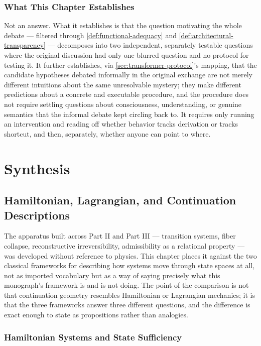 \documentclass[11pt]{book}
\theoremstyle{plain}
\theoremstyle{definition}
\theoremstyle{remark}
\begin{document}
\section{What This Chapter Establishes}

Not an answer. What it establishes is that the question motivating the
whole debate --- filtered through \cref{def:functional-adequacy} and
\cref{def:architectural-transparency} --- decomposes into two
independent, separately testable questions where the original
discussion had only one blurred question and no protocol for testing
it. It further establishes, via \cref{sec:transformer-protocol}'s
mapping, that the candidate hypotheses debated informally in the
original exchange are not merely different intuitions about the same
unresolvable mystery; they make different predictions about a concrete
and executable procedure, and the procedure does not require settling
questions about consciousness, understanding, or genuine semantics
that the informal debate kept circling back to. It requires only
running an intervention and reading off whether behavior tracks
derivation or tracks shortcut, and then, separately, whether anyone
can point to where.

\part{Synthesis}
\chapter{Hamiltonian, Lagrangian, and Continuation Descriptions}
\label{ch:hamiltonian-lagrangian-continuation}

The apparatus built across Part II and Part III --- transition systems,
fiber collapse, reconstructive irreversibility, admissibility as a
relational property --- was developed without reference to physics.
This chapter places it against the two classical frameworks for
describing how systems move through state spaces at all, not as
imported vocabulary but as a way of saying precisely what this
monograph's framework is and is not doing. The point of the comparison
is not that continuation geometry resembles Hamiltonian or Lagrangian
mechanics; it is that the three frameworks answer three different
questions, and the difference is exact enough to state as propositions
rather than analogies.

\section{Hamiltonian Systems and State Sufficiency}
\end{document}
